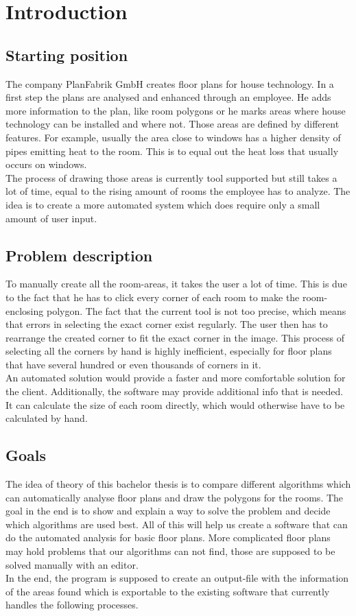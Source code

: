 \section{Introduction}
\subsection{Starting position}
The company PlanFabrik GmbH creates floor plans for house technology. In a first
step the plans are analysed and enhanced through an employee. He adds more
information to the plan, like room polygons or he marks areas where house technology
can be installed and where not. Those areas are defined by different features. For example, usually the area close to windows has a higher density of pipes emitting heat to the room. This is to equal out the heat loss that usually occurs on windows.
\\
The process of drawing those areas is currently tool supported but still takes a lot of time, equal to the rising amount of rooms the employee has to analyze. The idea is to create a more automated system which does require only a small amount of user input.

\subsection{Problem description}
\label{sub:ProblemDescription}
To manually create all the room-areas, it takes the user a lot of time. This is due to the fact that he has to click every corner of each room to make the room-enclosing polygon. The fact that the current tool is not too precise, which means that errors in selecting the exact corner exist regularly. The user then has to rearrange the created corner to fit the exact corner in the image. This process of selecting all the corners by hand is highly inefficient, especially for floor plans that have several hundred or even thousands of corners in it.
\\
An automated solution would provide a faster and more comfortable solution for the client. Additionally, the software may provide additional info that is needed. It can calculate the size of each room directly, which would otherwise have to be calculated by hand.

\subsection{Goals}
The idea of theory of this bachelor thesis is to compare different algorithms which can automatically analyse floor plans and draw the polygons for the rooms. The goal in the end is to show and explain a way to solve the problem and decide which algorithms are used best. All of this will help us create a software that can do the automated analysis for basic floor plans. More complicated floor plans may hold problems that our algorithms can not find, those are supposed to be solved manually with an editor.
\\
In the end, the program is supposed to create an output-file with the information of the areas found which is exportable to the existing software that currently handles the following processes.


